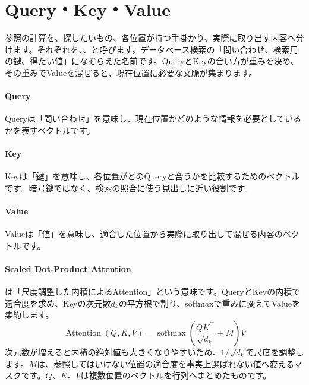 \section{Query・Key・Value}
\label{sec:06-machine-learning-23}

参照の計算を、探したいもの、各位置が持つ手掛かり、実際に取り出す内容へ分けます。それぞれを、、と呼びます。データベース検索の「問い合わせ、検索用の鍵、得たい値」になぞらえた名前です。QueryとKeyの合い方が重みを決め、その重みでValueを混ぜると、現在位置に必要な文脈が集まります。

\begingroup
\begingroup
\paragraph{Query}
        Queryは「問い合わせ」を意味し、現在位置がどのような情報を必要としているかを表すベクトルです。

\par
\endgroup
\medskip
\begingroup
\paragraph{Key}
        Keyは「鍵」を意味し、各位置がどのQueryと合うかを比較するためのベクトルです。暗号鍵ではなく、検索の照合に使う見出しに近い役割です。

\par
\endgroup
\medskip
\begingroup
\paragraph{Value}
        Valueは「値」を意味し、適合した位置から実際に取り出して混ぜる内容のベクトルです。

\par
\endgroup
  \vspace{5mm}
\paragraph{Scaled Dot-Product Attention}
        は「尺度調整した内積によるAttention」という意味です。QueryとKeyの内積で適合度を求め、Keyの次元数$d_k$の平方根で割り、softmaxで重みに変えてValueを集約します。
        \[
      \operatorname{Attention}(Q,K,V)
      =\operatorname{softmax}
      \left(\frac{QK^\top}{\sqrt{d_k}}+M\right)V
    \]
    次元数が増えると内積の絶対値も大きくなりやすいため、$1/\sqrt{d_k}$で尺度を調整します。$M$は、参照してはいけない位置の適合度を事実上選ばれない値へ変えるマスクです。$Q$、$K$、$V$は複数位置のベクトルを行列へまとめたものです。

